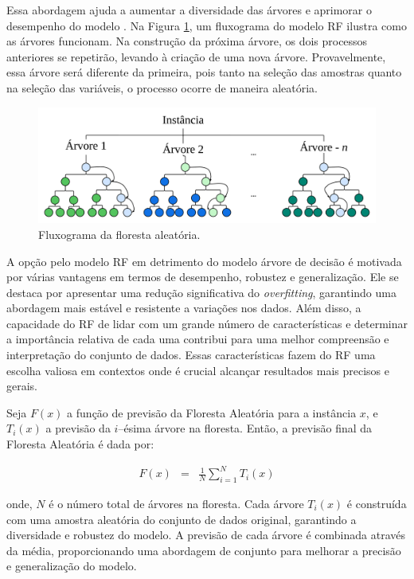  Essa abordagem ajuda a aumentar a diversidade das árvores e aprimorar o desempenho do modelo \cite{Pelletier2016156}. Na Figura \ref{fig:rf}, um fluxograma do modelo RF ilustra como as árvores funcionam.
 Na construção da próxima árvore, os dois processos anteriores se repetirão, levando à criação de uma nova árvore. Provavelmente, essa árvore será diferente da primeira, pois tanto na seleção das amostras quanto na seleção das variáveis, o processo ocorre de maneira aleatória.
  
 \begin{figure}[!htb]
 	\centering
 	\caption{Fluxograma da floresta aleatória.}
 	\label{fig:rf}
 	\includegraphics[width=\linewidth]{Modelos/Figuras/RF.pdf}
 \end{figure}
 
A opção pelo modelo RF em detrimento do modelo árvore de decisão é motivada por várias vantagens em termos de desempenho, robustez e generalização. Ele se destaca por apresentar uma redução significativa do \textit{overfitting}, garantindo uma abordagem mais estável e resistente a variações nos dados. Além disso, a capacidade do RF de lidar com um grande número de características e determinar a importância relativa de cada uma contribui para uma melhor compreensão e interpretação do conjunto de dados. Essas características fazem do RF uma escolha valiosa em contextos onde é crucial alcançar resultados mais precisos e gerais.

Seja $ F(x) $ a função de previsão da Floresta Aleatória para a instância $ x $, e $ T_i(x) $ a previsão da $ i $--ésima árvore na floresta. Então, a previsão final da Floresta Aleatória é dada por:

\begin{eqnarray}
	F(x) &=& \frac{1}{N} \sum_{i=1}^{N} T_i(x) 
\end{eqnarray}

\noindent onde, $ N $ é o número total de árvores na floresta. Cada árvore $ T_i(x) $ é construída com uma amostra aleatória do conjunto de dados original, garantindo a diversidade e robustez do modelo. A previsão de cada árvore é combinada através da média, proporcionando uma abordagem de conjunto para melhorar a precisão e generalização do modelo.
 
